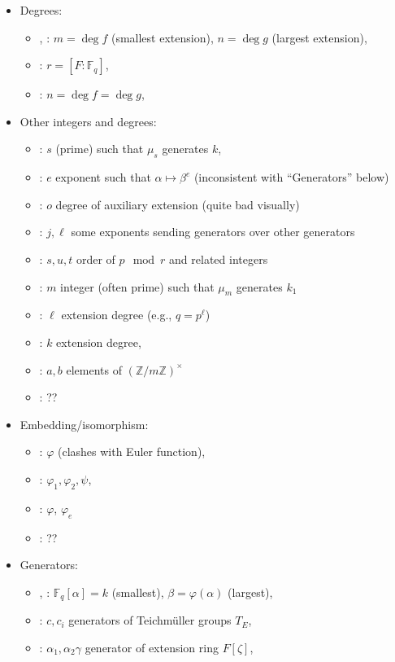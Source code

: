 \documentclass[12pt]{article}
\theoremstyle{plain}
\theoremstyle{definition}
\def\Z{\ensuremath{\mathbb{Z}}}
\def\F{\ensuremath{\mathbb{F}}}
\begin{document}
\begin{itemize}
\begin{itemize}
  \end{itemize}
\item Degrees:
  \begin{itemize}
  \item \poster, \prop: $m=\deg f$ (smallest extension), $n=\deg g$ (largest extension),
  \item \kummer: $r = [F:\F_q]$,
  \item \rains: $n=\deg f=\deg g$,
  \end{itemize}
\item Other integers and degrees:
  \begin{itemize}
  \item \poster: $s$ (prime) such that $\mu_s$ generates $k$,
  \item \poster: $e$ exponent such that $\alpha\mapsto\beta^e$
    (inconsistent with ``Generators'' below)
  \item \poster: $o$ degree of auxiliary extension (quite bad visually)
  \item \kummer: $j,\ell$ some exponents sending generators over other generators
  \item \kummer: $s,u,t$ order of $p \mod r$ and related integers
  \item \rains: $m$ integer (often prime) such that $\mu_m$ generates $k_1$ 
  \item \rains: $\ell$ extension degree (e.g., $q=p^\ell$)
  \item \rains: $k$ extension degree,
  \item \rains: $a,b$ elements of $(\Z/m\Z)^\times$
  \item \prop: ??
  \end{itemize}
\item Embedding/isomorphism:
  \begin{itemize}
  \item \poster: $\varphi$ (clashes with Euler function),
  \item \kummer: $\varphi_1,\varphi_2,\psi$,
  \item \rains: $\varphi$, $\varphi_e$
  \item \prop: ??
  \end{itemize}
\item Generators:
  \begin{itemize}
  \item \poster, \prop: $\F_q[\alpha]=k$ (smallest), $\beta = \varphi(\alpha)$ (largest), 
  \item \kummer: $c,c_i$ generators of Teichm\"uller groups $T_E$,
  \item \kummer: $\alpha_1,\alpha_2\gamma$ generator of extension ring $F[\zeta]$,

\end{itemize}
\end{itemize}
\end{document}
